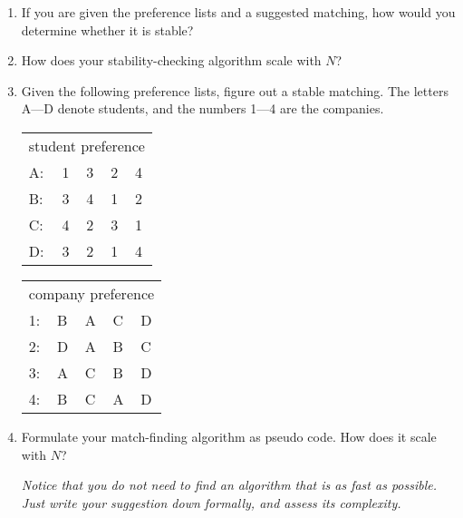 \documentclass[a4paper]{article}
\begin{document}
\begin{enumerate}

\item
  If you are given the preference lists and a suggested matching, how would you determine whether it is stable?
  
\item
  How does your stability-checking algorithm scale with $N$?
  
\item
  Given the following preference lists, figure out a stable matching.
  The letters A---D denote students, and the numbers 1---4 are the companies.
  
  \begin{center}
    \begin{tabular}{lllll}
      \toprule
      \multicolumn{5}{l}{student preference} \\
      A: & 1 & 3 & 2 & 4 \\
      B: & 3 & 4 & 1 & 2 \\
      C: & 4 & 2 & 3 & 1 \\
      D: & 3 & 2 & 1 & 4 \\
      \bottomrule
    \end{tabular}
    \hspace{5mm}
    \begin{tabular}{lllll}
      \toprule
      \multicolumn{5}{l}{company preference} \\
      1: & B & A & C & D \\
      2: & D & A & B & C \\
      3: & A & C & B & D \\
      4: & B & C & A & D \\
      \bottomrule
    \end{tabular}
  \end{center}
  
\item
  Formulate your match-finding algorithm as pseudo code.
  How does it scale with $N$?
  
  \emph{
    Notice that you do not need to find an algorithm that is as fast as possible.
    Just write your suggestion down formally, and assess its complexity.
  }
  
\end{enumerate}
\end{document}
